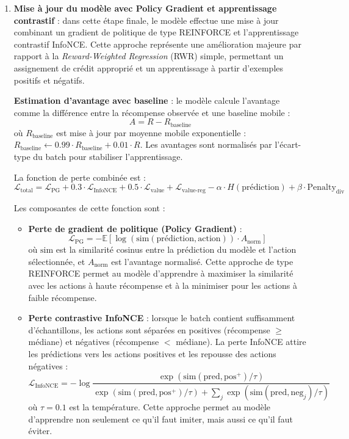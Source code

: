 \begin{enumerate}
    \item \textbf{Mise à jour du modèle avec Policy Gradient et apprentissage contrastif} : dans cette étape finale, le modèle effectue une mise à jour combinant un gradient de politique de type REINFORCE et l'apprentissage contrastif InfoNCE. Cette approche représente une amélioration majeure par rapport à la \textit{Reward-Weighted Regression} (RWR) simple, permettant un assignement de crédit approprié et un apprentissage à partir d'exemples positifs et négatifs.
    
    \textbf{Estimation d'avantage avec baseline} : le modèle calcule l'avantage comme la différence entre la récompense observée et une baseline mobile :
    \[
    A = R - R_{\text{baseline}}
    \]
    où $R_{\text{baseline}}$ est mise à jour par moyenne mobile exponentielle : $R_{\text{baseline}} \leftarrow 0.99 \cdot R_{\text{baseline}} + 0.01 \cdot R$. Les avantages sont normalisés par l'écart-type du batch pour stabiliser l'apprentissage.
    
    La fonction de perte combinée est :
    \[
    \mathcal{L}_{\text{total}} = \mathcal{L}_{\text{PG}} + 0.3 \cdot \mathcal{L}_{\text{InfoNCE}} + 0.5 \cdot \mathcal{L}_{\text{value}} + \mathcal{L}_{\text{value-reg}} - \alpha \cdot H(\text{prédiction}) + \beta \cdot \text{Penalty}_{\text{div}}
    \]
    
    Les composantes de cette fonction sont :
    \begin{itemize}
        \item \textbf{Perte de gradient de politique (Policy Gradient)} : 
        \[
        \mathcal{L}_{\text{PG}} = -\mathbb{E}\left[\log(\text{sim}(\text{prédiction}, \text{action})) \cdot A_{\text{norm}}\right]
        \]
        où $\text{sim}$ est la similarité cosinus entre la prédiction du modèle et l'action sélectionnée, et $A_{\text{norm}}$ est l'avantage normalisé. Cette approche de type REINFORCE permet au modèle d'apprendre à maximiser la similarité avec les actions à haute récompense et à la minimiser pour les actions à faible récompense.
        
        \item \textbf{Perte contrastive InfoNCE} : lorsque le batch contient suffisamment d'échantillons, les actions sont séparées en positives (récompense $\geq$ médiane) et négatives (récompense $<$ médiane). La perte InfoNCE attire les prédictions vers les actions positives et les repousse des actions négatives :
        \[
        \mathcal{L}_{\text{InfoNCE}} = -\log\frac{\exp(\text{sim}(\text{pred}, \text{pos}^+)/\tau)}{\exp(\text{sim}(\text{pred}, \text{pos}^+)/\tau) + \sum_j \exp(\text{sim}(\text{pred}, \text{neg}_j)/\tau)}
        \]
        où $\tau = 0.1$ est la température. Cette approche permet au modèle d'apprendre non seulement ce qu'il faut imiter, mais aussi ce qu'il faut éviter.
        

\end{itemize}
\end{enumerate}
